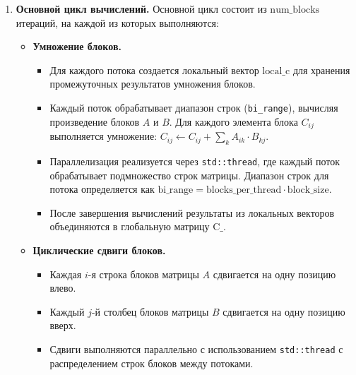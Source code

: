 \documentclass[a4paper,12pt]{article}
\begin{document}
\begin{enumerate}
    \item \textbf{Основной цикл вычислений.}
    Основной цикл состоит из \( \text{num\_blocks} \) итераций, на каждой из которых выполняются:
    \begin{itemize}
        \item \textbf{Умножение блоков.}
        \begin{itemize}
            \item Для каждого потока создается локальный вектор \( \text{local\_c} \) для хранения промежуточных результатов умножения блоков.
            \item Каждый поток обрабатывает диапазон строк (\texttt{bi\_range}), вычисляя произведение блоков \( A \) и \( B \). Для каждого элемента блока \( C_{ij} \) выполняется умножение: \( C_{ij} \gets C_{ij} + \sum_k A_{ik} \cdot B_{kj} \).
            \item Параллелизация реализуется через \texttt{std::thread}, где каждый поток обрабатывает подмножество строк матрицы. Диапазон строк для потока определяется как \( \text{bi\_range} = \text{blocks\_per\_thread} \cdot \text{block\_size} \).
            \item После завершения вычислений результаты из локальных векторов объединяются в глобальную матрицу \( \text{C\_} \).
        \end{itemize}
        \item \textbf{Циклические сдвиги блоков.}
        \begin{itemize}
            \item Каждая \( i \)-я строка блоков матрицы \( A \) сдвигается на одну позицию влево.
            \item Каждый \( j \)-й столбец блоков матрицы \( B \) сдвигается на одну позицию вверх.
            \item Сдвиги выполняются параллельно с использованием \texttt{std::thread} с распределением строк блоков между потоками.
        \end{itemize}
    \end{itemize}
\end{enumerate}
\end{document}
